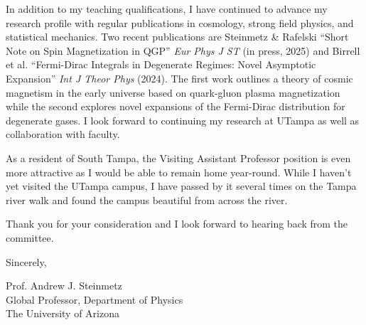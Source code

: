 \documentclass[11pt]{article}
\begin{document}
In addition to my teaching qualifications, I have continued to advance my research profile with regular publications in cosmology, strong field physics, and statistical mechanics. Two recent publications are Steinmetz \& Rafelski ``Short Note on Spin Magnetization in QGP'' \emph{Eur Phys J ST} (in press, 2025) and Birrell et al. ``Fermi-Dirac Integrals in Degenerate Regimes: Novel Asymptotic Expansion'' \emph{Int J Theor Phys} (2024). The first work outlines a theory of cosmic magnetism in the early universe based on quark-gluon plasma magnetization while the second explores novel expansions of the Fermi-Dirac distribution for degenerate gases. I look forward to continuing my research at UTampa as well as collaboration with faculty.

As a resident of South Tampa, the Visiting Assistant Professor position is even more attractive as I would be able to remain home year-round. While I haven't yet visited the UTampa campus, I have passed by it several times on the Tampa river walk and found the campus beautiful from across the river.

Thank you for your consideration and I look forward to hearing back from the committee.

\vspace{1em}

\noindent
Sincerely,

\vspace{2em}

\noindent
Prof. Andrew J. Steinmetz\\
Global Professor, Department of Physics\\
The University of Arizona
\end{document}
